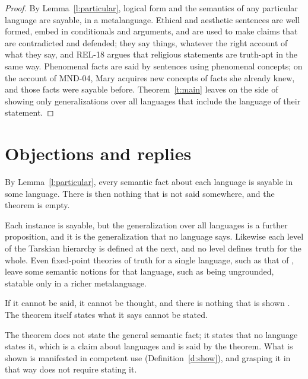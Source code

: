 \documentclass{situationist-preprint}
\begin{document}
\begin{proof}
By Lemma~\ref{l:particular}, logical form and the semantics of any particular language are sayable, in a metalanguage. Ethical and aesthetic sentences are well formed, embed in conditionals and arguments, and are used to make claims that are contradicted and defended; they say things, whatever the right account of what they say, and REL-18 argues that religious statements are truth-apt in the same way. Phenomenal facts are said by sentences using phenomenal concepts; on the account of MND-04, Mary acquires new concepts of facts she already knew, and those facts were sayable before. Theorem~\ref{t:main} leaves on the side of showing only generalizations over all languages that include the language of their statement.
\end{proof}

\section{Objections and replies}

\begin{objection}[Hierarchy]\label{o:hier}
By Lemma~\ref{l:particular}, every semantic fact about each language is sayable in some language. There is then nothing that is not said somewhere, and the theorem is empty.
\end{objection}

\begin{reply}
Each instance is sayable, but the generalization over all languages is a further proposition, and it is the generalization that no language says. Likewise each level of the Tarskian hierarchy is defined at the next, and no level defines truth for the whole. Even fixed-point theories of truth for a single language, such as that of \citet{Kripke1975}, leave some semantic notions for that language, such as being ungrounded, statable only in a richer metalanguage.
\end{reply}

\begin{objection}[Whistling]\label{o:whistle}
If it cannot be said, it cannot be thought, and there is nothing that is shown \citep{Ramsey1931}. The theorem itself states what it says cannot be stated.
\end{objection}

\begin{reply}
The theorem does not state the general semantic fact; it states that no language states it, which is a claim about languages and is said by the theorem. What is shown is manifested in competent use (Definition~\ref{d:show}), and grasping it in that way does not require stating it.
\end{reply}
\end{document}
